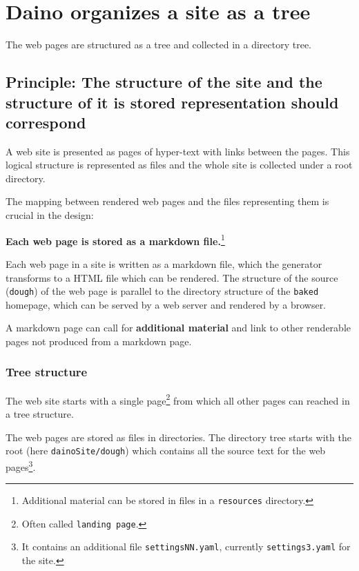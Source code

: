 \documentclass{tufte-book}
\begin{document}
\chapter{Daino organizes a site as a tree}
\begin{mdframed}The web pages are structured as a tree and collected in a directory tree.\end{mdframed}
\hypertarget{principle-the-structure-of-the-site-and-the-structure-of-it-is-stored-representation-should-correspond}{%
	\section{Principle: The structure of the site and the structure of it is
		stored representation should
		correspond}\label{principle-the-structure-of-the-site-and-the-structure-of-it-is-stored-representation-should-correspond}}

A web site is presented as pages of hyper-text with links between the
pages\citep{berners2001semantic}. This logical structure is represented
as files and the whole site is collected under a root directory.

The mapping between rendered web pages and the files representing them
is crucial in the design:

\textbf{Each web page is stored as a markdown file.}\footnote{Additional
	material can be stored in files in a \texttt{resources} directory.}

Each web page in a site is written as a markdown file, which the
generator transforms to a HTML file which can be rendered. The structure
of the source (\texttt{dough}) of the web page is parallel to the
directory structure of the \texttt{baked} homepage, which can be served
by a web server and rendered by a browser.

A markdown page can call for \textbf{additional material} and link to
other renderable pages not produced from a markdown page.

\hypertarget{tree-structure}{%
	\subsection{Tree structure}\label{tree-structure}}

The web site starts with a single page\footnote{Often called
	\texttt{landing\ page}.} from which all other pages can reached in a
tree structure.

The web pages are stored as files in directories. The directory tree
starts with the root (here \texttt{dainoSite/dough}) which contains all
the source text for the web pages\footnote{It contains an additional
	file \texttt{settingsNN.yaml}, currently \texttt{settings3.yaml} for
	the site.}.
\end{document}
